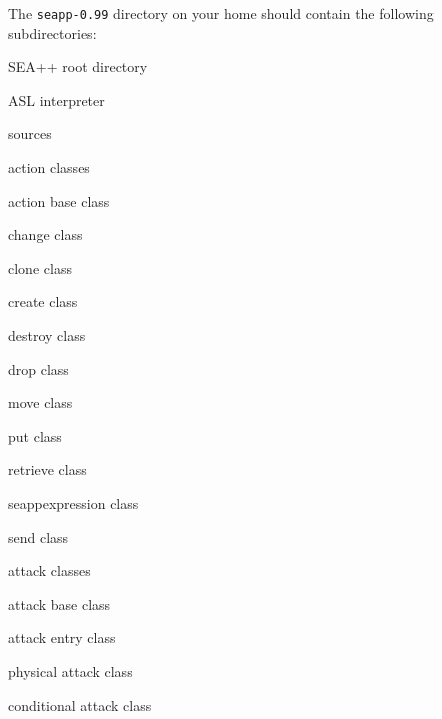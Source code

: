 The \texttt{seapp-0.99} directory on your home should contain the following subdirectories:
%
\begin{description}[noitemsep]
\item[] { SEA++ root directory}
	\item[] { ASL interpreter}
	\item[] { sources}
		\item[] { action classes}
			\item[] { action base class}
			\item[] { change class}
			\item[] { clone class}
			\item[] { create class}
			\item[] { destroy class}
			\item[] { drop class}
			\item[] { move class}
			\item[] { put class}
			\item[] { retrieve class}
			\item[] { seappexpression class}
			\item[] { send class}
		\item[] { attack classes}
			\item[] { attack base class}
			\item[] { attack entry class}
			\item[] { physical attack class}
			\item[] { conditional attack class}

\end{description}
